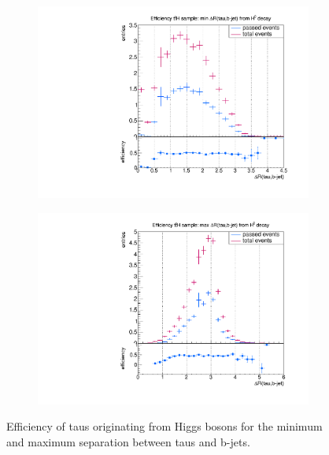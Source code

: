 \begin{figure}
  \centering
                \begin{subfigure}[t]{0.49\textwidth}
                \includegraphics[width=\textwidth]{figures/plots/ttH/Divided_mindR_fromH_taubjet.pdf}
                \label{dR:fromH:taubjets:min}
                \end{subfigure}
                \begin{subfigure}[t]{0.49\textwidth}
                \includegraphics[width=\textwidth]{figures/plots/ttH/Divided_maxdR_fromH_taubjet.pdf}
                \label{dR:fromH:taubjets:max}
                \end{subfigure}
\caption[Efficiency of taus originating from Higgs bosons for the separation between taus and b-jets.]{Efficiency of taus originating from Higgs bosons for the minimum and maximum separation between taus and b-jets.}
\label{dR:fromH:taubjets}
\end{figure}
